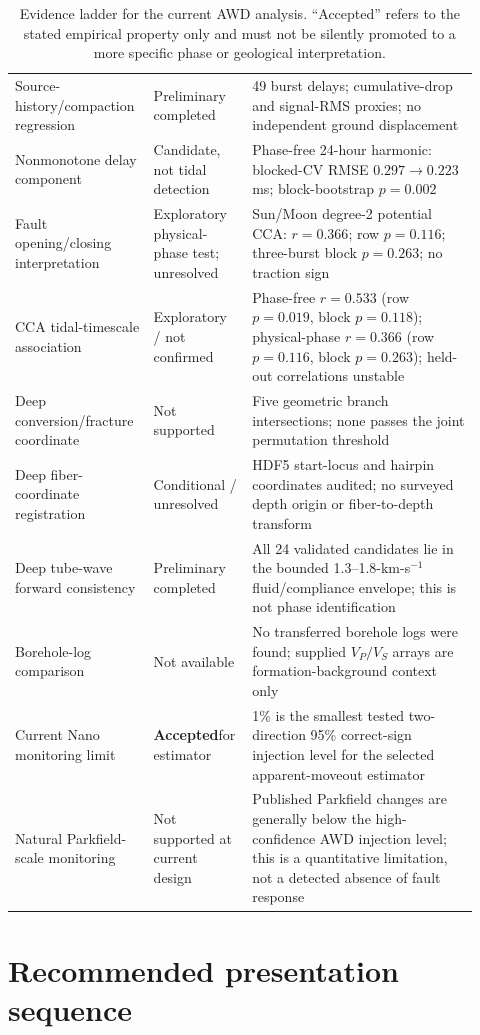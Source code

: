 \documentclass[11pt]{article}
\newcommand{\accepted}{\textcolor{accepted}{\textbf{Accepted}}}
\begin{document}
\begin{table}[H]
\begin{tabular}{p{0.29\linewidth}p{0.16\linewidth}p{0.47\linewidth}}
Source-history/compaction regression & Preliminary completed & 49 burst delays; cumulative-drop and signal-RMS proxies; no independent ground displacement \\
Nonmonotone delay component & Candidate, not tidal detection & Phase-free 24-hour harmonic: blocked-CV RMSE $0.297\to0.223$ ms; block-bootstrap $p=0.002$ \\
Fault opening/closing interpretation & Exploratory physical-phase test; unresolved & Sun/Moon degree-2 potential CCA: $r=0.366$; row $p=0.116$; three-burst block $p=0.263$; no traction sign \\
CCA tidal-timescale association & Exploratory / not confirmed & Phase-free $r=0.533$ (row $p=0.019$, block $p=0.118$); physical-phase $r=0.366$ (row $p=0.116$, block $p=0.263$); held-out correlations unstable \\
Deep conversion/fracture coordinate & Not supported & Five geometric branch
intersections; none passes the joint permutation threshold \\
Deep fiber-coordinate registration & Conditional / unresolved & HDF5 start-locus and hairpin coordinates audited; no surveyed depth origin or fiber-to-depth transform \\
Deep tube-wave forward consistency & Preliminary completed & All 24 validated candidates lie in the bounded 1.3--1.8-km-s$^{-1}$ fluid/compliance envelope; this is not phase identification \\
Borehole-log comparison & Not available & No transferred borehole logs were found; supplied $V_P/V_S$ arrays are formation-background context only \\
Current Nano monitoring limit & \accepted for estimator & 1\% is the smallest
tested two-direction 95\% correct-sign injection level for the selected
apparent-moveout estimator \\
Natural Parkfield-scale monitoring & Not supported at current design & Published
Parkfield changes are generally below the high-confidence AWD injection level;
this is a quantitative limitation, not a detected absence of fault response \\
\bottomrule
\end{tabular}
\caption{Evidence ladder for the current AWD analysis.  ``Accepted'' refers to
the stated empirical property only and must not be silently promoted to a more
specific phase or geological interpretation.}
\end{table}

\section{Recommended presentation sequence}
\end{document}
